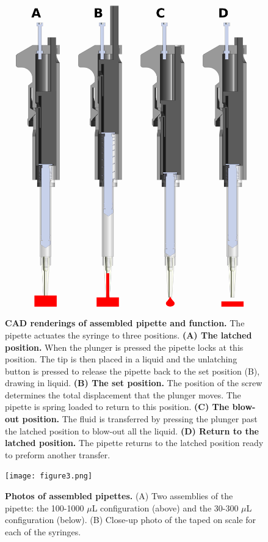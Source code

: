 \documentclass{naturegraphicx}
\begin{document}
\begin{figure}
\includegraphics[scale=0.4]{figure2.png} %
\caption{
{\bf CAD renderings of assembled pipette and function.} The pipette actuates the syringe to three positions. {\bf (A) The latched position.} When the plunger is pressed the pipette locks at this position. The tip is then placed in a liquid and the unlatching button is pressed to release the pipette back to the set position (B), drawing in liquid.  {\bf(B) The set position.} The position of the screw determines the total displacement that the plunger moves. The pipette is spring loaded to return to this position. {\bf (C) The blow-out position.} The fluid is transferred by pressing the plunger past the latched position to blow-out all the liquid. {\bf (D) Return to the latched position.} The pipette returns to the latched position ready to preform another transfer.
}
\label{fig2}
\end{figure}

\begin{figure}
\texttt{[image: figure3.png]} %
\caption{
{\bf Photos of assembled pipettes.}  (A) Two assemblies of the pipette: the 100-1000 $\mu$L configuration (above) and the 30-300 $\mu$L configuration (below). (B) Close-up photo of the taped on scale for each of the syringes. 
}
\label{fig3}
\end{figure}
\end{document}
